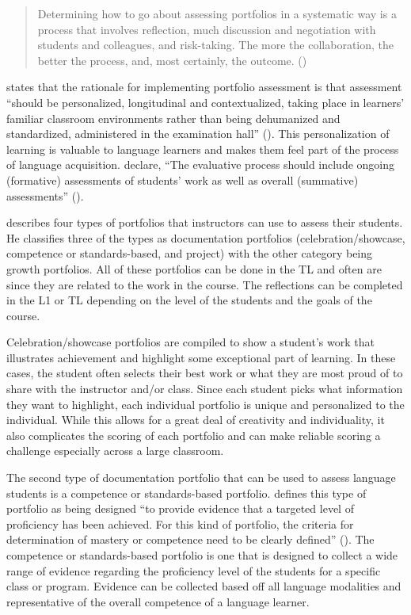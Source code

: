 \documentclass[output=paper]{langscibook}
\begin{document}
\begin{quote}
Determining how to go about assessing portfolios in a systematic way is a process that involves reflection, much discussion and negotiation with students and colleagues, and risk-taking. The more the collaboration, the better the process, and, most certainly, the outcome. (\citeyear[22]{TedickKlee1998})
\end{quote}

\citet{Lam2017} states that the rationale for implementing portfolio assessment is that assessment “should be personalized, longitudinal and contextualized, taking place in learners’ familiar classroom environments rather than being dehumanized and standardized, administered in the examination hall” (\citeyear[85]{Lam2017}). This personalization of learning is valuable to language learners and makes them feel part of the process of language acquisition. \citet{TedickKlee1998} declare, “The evaluative process should include ongoing (formative) assessments of students’ work as well as overall (summative) assessments” (\citeyear[21]{TedickKlee1998}).

\citet{McMillan2018} describes four types of portfolios that instructors can use to assess their students. He classifies three of the types as documentation portfolios (celebration/showcase, competence or standards-based, and project) with the other category being growth portfolios. All of these portfolios can be done in the TL and often are since they are related to the work in the course. The reflections can be completed in the L1 or TL depending on the level of the students and the goals of the course.

Celebration/showcase portfolios are compiled to show a student’s work that illustrates achievement and highlight some exceptional part of learning. In these cases, the student often selects their best work or what they are most proud of to share with the instructor and/or class. Since each student picks what information they want to highlight, each individual portfolio is unique and personalized to the individual. While this allows for a great deal of creativity and individuality, it also complicates the scoring of each portfolio and can make reliable scoring a challenge especially across a large classroom.

The second type of documentation portfolio that can be used to assess language students is a competence or standards-based portfolio. \citet{McMillan2018} defines this type of portfolio as being designed “to provide evidence that a targeted level of proficiency has been achieved. For this kind of portfolio, the criteria for determination of mastery or competence need to be clearly defined” (\citeyear[304]{McMillan2018}). The competence or standards-based portfolio is one that is designed to collect a wide range of evidence regarding the proficiency level of the students for a specific class or program. Evidence can be collected based off all language modalities and representative of the overall competence of a language learner.
\end{document}
